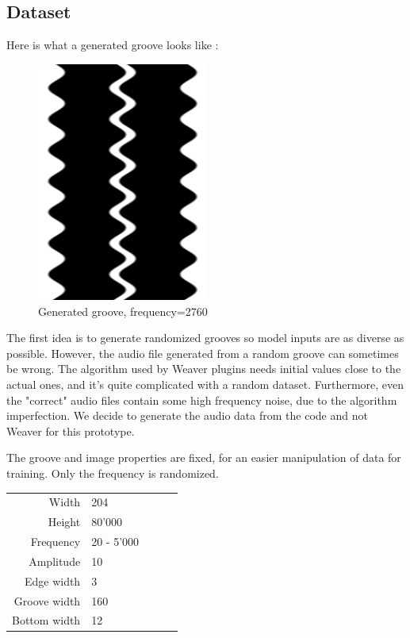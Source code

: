 \documentclass[12pt, twoside]{article}
\begin{document}
\subsection{Dataset}
Here is what a generated groove looks like :
\begin{figure}[H]
	\centering
	\includegraphics[width=0.5\textwidth]{../images/example_groove.png}
	\caption{Generated groove, frequency=2760}
	\label{gengroove}
\end{figure}
The first idea is to generate randomized grooves so model inputs are as diverse as possible. However, the audio file generated from a random groove can sometimes be wrong. The algorithm used by Weaver plugins needs initial values close to the actual ones, and it's quite complicated with a random dataset. Furthermore, even the "correct" audio files contain some high frequency noise, due to the algorithm imperfection. We decide to generate the audio data from the code and not Weaver for this prototype.

The groove and image properties are fixed, for an easier manipulation of data for training. Only the frequency is randomized.
\begin{table}[H]
	\begin{tabular}{|r|l|lll}
		\cline{1-2}
		Width        & 204        &  &  &  \\ \cline{1-2}
		Height       & 80'000     &  &  &  \\ \cline{1-2}
		Frequency    & 20 - 5'000 &  &  &  \\ \cline{1-2}
		Amplitude    & 10         &  &  &  \\ \cline{1-2}
		Edge width   & 3          &  &  &  \\ \cline{1-2}
		Groove width & 160        &  &  &  \\ \cline{1-2}
		Bottom width & 12         &  &  &  \\ \cline{1-2}
	\end{tabular}
\end{table}
\end{document}
